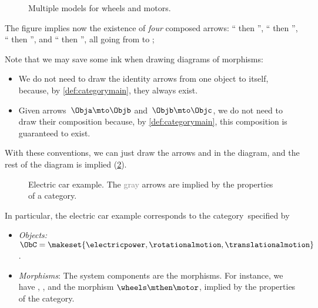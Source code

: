 \begin{figure}[h!]
    \centering
    \caption{Multiple models for wheels and motors.}
    \label{fig:e4bis}
\end{figure}

The figure implies now the existence of \emph{four} composed arrows: `` then '', `` then '', `` then '', and `` then '', all going from \translationalmotion to \electricpower;





Note that we may save some ink when drawing diagrams of morphisms:
\begin{itemize}
    \item We do not need to draw the identity arrows from one object to itself, because, by \cref{def:categorymain}, they always exist.
    \item  Given arrows~$\Obja \mto \Objb$ and~$\Objb \mto \Objc$, we do not need to draw their composition because, by \cref{def:categorymain}, this composition is guaranteed to exist.
\end{itemize}

With these conventions, we can just draw the arrows \motor and \wheels in the diagram, and the rest of the diagram is implied (\cref{fig:e5}).

\begin{figure}[h!]
    \centering
    \caption{
        Electric car example.
        The \textcolor{gray}{gray} arrows are implied by the properties of a category.
    }
    \label{fig:e5}
\end{figure}

In particular, the electric car example corresponds to the category~\CatC specified by
\begin{itemize}
    \item \emph{Objects:} $\ObC=\makeset{ \electricpower,\rotationalmotion,\translationalmotion}$.
    \item \emph{Morphisms}: The system components are the morphisms.
          For instance, we have \motor, \wheels, and the morphism $\wheels \mthen \motor$, implied by the properties of the category.
\end{itemize}

